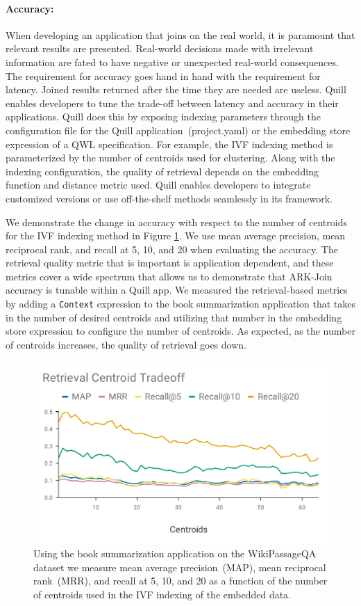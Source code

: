 \documentclass[11pt]{article}
\begin{document}
\paragraph{Accuracy:}
\label{sec:evaluation:accuracy}
When developing an application that joins on the real world, it is paramount that relevant results are presented.
Real-world decisions made with irrelevant information are fated to have negative or unexpected real-world consequences.
The requirement for accuracy goes hand in hand with the requirement for latency.
Joined results returned after the time they are needed are useless.
Quill enables developers to tune the trade-off between latency and accuracy in their applications.
Quill does this by exposing indexing parameters through the configuration file for the Quill application~(project.yaml) or the embedding store expression of a QWL specification.
For example, the IVF indexing method is parameterized by the number of centroids used for clustering.
Along with the indexing configuration, the quality of retrieval depends on the embedding function and distance metric used.
Quill enables developers to integrate customized versions or use off-the-shelf methods seamlessly in its framework.

We demonstrate the change in accuracy with respect to the number of centroids for the IVF indexing method in Figure \ref{fig:accuracy}.
We use mean average precision, mean reciprocal rank, and recall at 5, 10, and 20 when evaluating the accuracy.
The retrieval quality metric that is important is application dependent, and these metrics cover a wide spectrum that allows us to demonstrate that ARK-Join accuracy is tunable within a Quill app.
We measured the retrieval-based metrics by adding a \texttt{Context} expression to the book summarization application that takes in the number of desired centroids and utilizing that number in the embedding store expression to configure the number of centroids.
As expected, as the number of centroids increases, the quality of retrieval goes down.

\begin{figure}[ht]
  \centering
  \includegraphics[width=0.6\linewidth]{figs/accuracy_large.pdf}
  \caption{Using the book summarization application on the WikiPassageQA dataset we measure mean average precision~(MAP), mean reciprocal rank~(MRR), and recall at 5, 10, and 20 as a function of the number of centroids used in the IVF indexing of the embedded data. }
  \label{fig:accuracy}
\end{figure}
\end{document}
